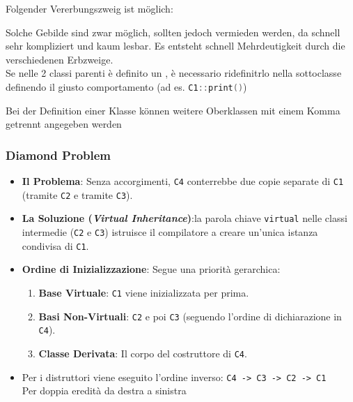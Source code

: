 Folgender Vererbungszweig ist möglich:\\
\noindent
\begin{minipage}{0.38\columnwidth}
    
\end{minipage}
\begin{minipage}{0.62\columnwidth}
Solche Gebilde sind zwar möglich, sollten jedoch vermieden werden, da schnell sehr kompliziert und kaum lesbar. 
Es entsteht schnell Mehrdeutigkeit durch die verschiedenen Erbzweige.\\

Se nelle 2 classi parenti è definito un , è necessario
ridefinitrlo nella sottoclasse definendo il giusto comportamento (ad es. \lstinline[language=C++]|C1::print()|)
\end{minipage}

Bei der Definition einer Klasse können weitere Oberklassen mit einem Komma getrennt angegeben werden
\vspace{-1em}

\subsubsection{Diamond Problem}

\begin{itemize}
    \item \textbf{Il Problema}: Senza accorgimenti, \texttt{C4} conterrebbe due copie 
    separate di \texttt{C1} (tramite \texttt{C2} e tramite \texttt{C3}). 
    \item \textbf{La Soluzione (\textit{Virtual Inheritance})}:la parola 
    chiave \texttt{virtual} nelle classi intermedie (\texttt{C2} e \texttt{C3})
    istruisce il compilatore a creare un'unica istanza condivisa di \texttt{C1}.
    \item \textbf{\color{red}Ordine di Inizializzazione}: Segue una priorità gerarchica:
    \begin{enumerate}
        \item \textbf{Base Virtuale}: \texttt{C1} viene inizializzata per prima.
        \item \textbf{Basi Non-Virtuali}: \texttt{C2} e poi \texttt{C3} (seguendo l'ordine di dichiarazione in \texttt{C4}).
        \item \textbf{Classe Derivata}: Il corpo del costruttore di \texttt{C4}.
    \end{enumerate}
    \item Per i distruttori viene eseguito l'ordine inverso: \texttt{C4 -> C3 -> C2 -> C1}\\
        Per doppia eredità da destra a sinistra
\end{itemize}

